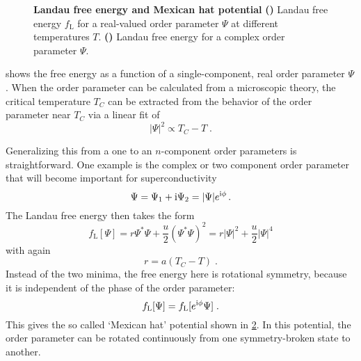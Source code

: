 \documentclass[../notes.tex]{subfiles}
\begin{document}
\begin{figure}[t]
	\centering
	\begin{subfigure}[b]{0.5\textwidth}
		\centering
		\caption{\hfill\null}\label{sfig:Landau free energy}
		
	\end{subfigure}%
	\begin{subfigure}[b]{0.5\textwidth}
		\centering
		\caption{\hfill\null}\label{sfig:Ginzburg Landau free energy}
		
	\end{subfigure}
	\caption{
		\textbf{Landau free energy and Mexican hat potential} \textbf{()} Landau free energy \(f_{\mathrm{L}}\) for a real-valued order parameter \(\Psi\) at different temperatures \(T\). \textbf{()} Landau free energy for a complex order parameter \(\Psi\).
	} 
	\label{fig:Landau free energy and Ginzburg-Landau free energy}
\end{figure}

 shows the free energy as a function of a single-component, real order parameter \(\Psi\).
When the order parameter can be calculated from a microscopic theory, the critical temperature \(T_C\) can be extracted from the behavior of the order parameter near \(T_C\) via a linear fit of
\begin{equation}
	\vert \Psi \vert^2 \propto T_C - T \;.
\end{equation}

Generalizing this from a one to an \(n\)-component order parameters is straightforward.
One example is the complex or two component order parameter that will become important for superconductivity
\begin{equation}
	\Psi = \Psi_1 + \mathrm{i} \Psi_2 = \vert \Psi \vert e^{\mathrm{i} \phi} \,.
\end{equation}
The Landau free energy then takes the form
\begin{equation}
	f_{\mathrm{L}} [\Psi] = r \Psi^* \Psi + \frac{u}{2} (\Psi^* \Psi)^2 = r \vert \Psi \vert^2 + \frac{u}{2} \vert \Psi \vert^4
\end{equation}
with again
\begin{equation}
	r = a(T_C - T) \;.
\end{equation}
Instead of the two minima, the free energy here is rotational symmetry, because it is independent of the phase of the order parameter: 
\begin{equation}
	f_{\mathrm{L}} [\Psi] = f_{\mathrm{L}} [e^{\mathrm{i} \phi} \Psi] \;.
\end{equation}
This gives the so called `Mexican hat' potential shown in \cref{sfig:Ginzburg Landau free energy}.
In this potential, the order parameter can be rotated continuously from one symmetry-broken state to another.
\end{document}
